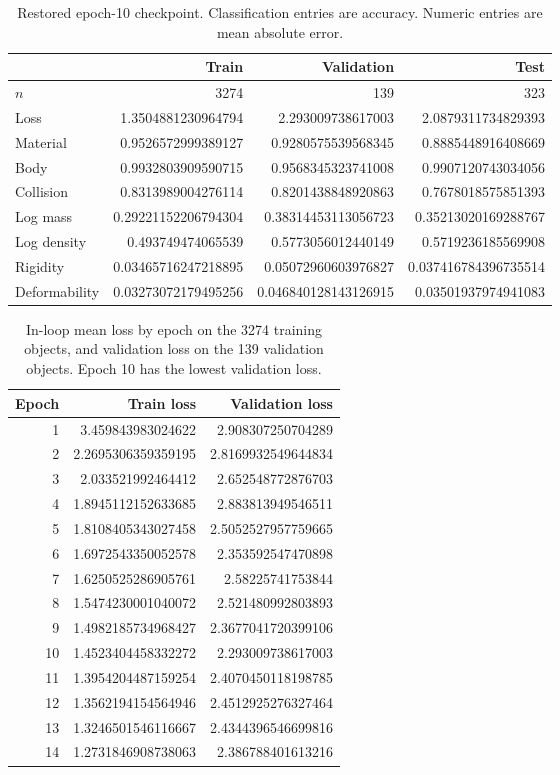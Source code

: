 \documentclass[10pt,letterpaper]{article}
\DeclareRobustCommand{\_}{\textunderscore\allowbreak}
\begin{document}
\begin{table}[t]
\centering
\caption{Restored epoch-10 checkpoint. Classification entries are accuracy. Numeric entries are mean absolute error.}
\label{tab:scores}
\small
\setlength{\tabcolsep}{5pt}
\begin{tabular}{lrrr}
\hline
 & Train & Validation & Test \\
\hline
\(n\) & 3274 & 139 & 323 \\
Loss & 1.3504881230964794 & 2.293009738617003 & 2.0879311734829393 \\
Material & 0.9526572999389127 & 0.9280575539568345 & 0.8885448916408669 \\
Body & 0.9932803909590715 & 0.9568345323741008 & 0.9907120743034056 \\
Collision & 0.8313989004276114 & 0.8201438848920863 & 0.7678018575851393 \\
Log mass & 0.29221152206794304 & 0.38314453113056723 & 0.35213020169288767 \\
Log density & 0.493749474065539 & 0.5773056012440149 & 0.5719236185569908 \\
Rigidity & 0.03465716247218895 & 0.05072960603976827 & 0.037416784396735514 \\
Deformability & 0.03273072179495256 & 0.046840128143126915 & 0.03501937974941083 \\
\hline
\end{tabular}
\end{table}

\begin{table}[t]
\centering
\caption{In-loop mean loss by epoch on the 3274 training objects, and validation loss on the 139 validation objects. Epoch 10 has the lowest validation loss.}
\label{tab:curve}
\small
\setlength{\tabcolsep}{8pt}
\begin{tabular}{rrr}
\hline
Epoch & Train loss & Validation loss \\
\hline
1 & 3.459843983024622 & 2.908307250704289 \\
2 & 2.2695306359359195 & 2.8169932549644834 \\
3 & 2.033521992464412 & 2.652548772876703 \\
4 & 1.8945112152633685 & 2.883813949546511 \\
5 & 1.8108405343027458 & 2.5052527957759665 \\
6 & 1.6972543350052578 & 2.353592547470898 \\
7 & 1.6250525286905761 & 2.58225741753844 \\
8 & 1.5474230001040072 & 2.521480992803893 \\
9 & 1.4982185734968427 & 2.3677041720399106 \\
10 & 1.4523404458332272 & 2.293009738617003 \\
11 & 1.3954204487159254 & 2.4070450118198785 \\
12 & 1.3562194154564946 & 2.4512925276327464 \\
13 & 1.3246501546116667 & 2.4344396546699816 \\
14 & 1.2731846908738063 & 2.386788401613216 \\
\hline
\end{tabular}
\end{table}
\end{document}
